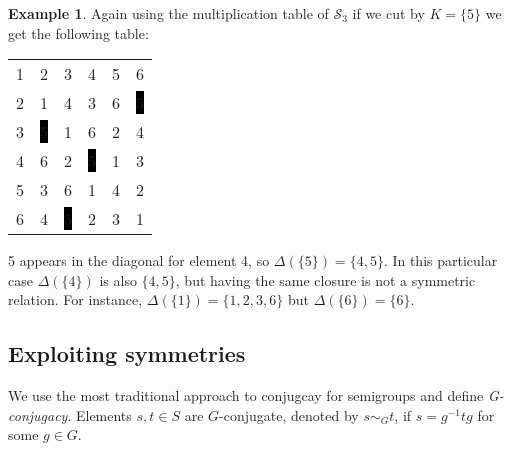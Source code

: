 \documentclass{amsart}
\newcommand{\cS}{{\mathcal S}}
\theoremstyle{plain}
\theoremstyle{definition}
\newtheorem{example}[theorem]{Example}
\begin{document}
\begin{example}
Again using the multiplication table of $\cS_3$ if we cut by $K=\{5\}$ we get the following table:
\begin{center}
\begin{tabular}{@{}c@{}c@{}c@{}c@{}c@{}c@{}}
1&2&3&4&\color{lgr}5&6\\
2&1&4&3&\color{lgr}6&\color{white}\colorbox{black}{5}\\
3&\color{white}\colorbox{black}{5}&1&6&\color{lgr}2&4\\
4&6&2&\color{white}\colorbox{black}{5}&\color{lgr}1&3\\
\color{lgr}5&\color{lgr}3&\color{lgr}6&\color{lgr}1&\color{lgr}4&\color{lgr}2\\
6&4&\color{white}\colorbox{black}{5}&2&\color{lgr}3&1\\
\end{tabular}
\end{center}
5 appears in the diagonal for element 4, so $\Delta(\{5\})=\{4,5\}$. In this particular case $\Delta(\{4\})$ is also $\{4,5\}$, but having the same closure is not a symmetric relation. For instance, $\Delta(\{1\})=\{1,2,3,6\}$ but $\Delta(\{6\})=\{6\}$. 
\end{example}






\subsection{Exploiting symmetries}

We use the most traditional approach to conjugcay for semigroups  and define \emph{G-conjugacy}. Elements $s,t\in S$ are $G$-conjugate, denoted by $s\sim_G t$, if $s=g^{-1}tg$ for some $g\in G$. 
\end{document}
